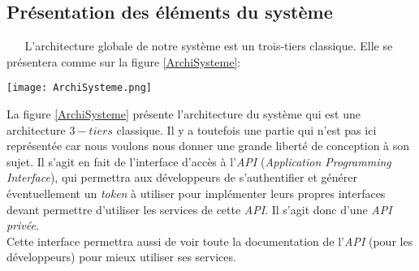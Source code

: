 \subsection{Présentation des éléments du système}
$ _{} $ $ _{} $ $ _{} $ $ _{} $ $ _{} $L'architecture globale de notre système est un trois-tiers classique. Elle se présentera comme sur la figure \ref{ArchiSysteme}:
\begin{center}
\texttt{[image: ArchiSysteme.png]}
\label{ArchiSysteme}
\end{center}
La figure \ref{ArchiSysteme} présente l'architecture du système qui est une architecture $ 3-tiers $ classique. Il y a toutefois une partie qui n'est pas ici représentée car nous voulons nous donner une grande liberté de conception à son sujet. Il s'agit en fait de l'interface d'accès à l'\textit{API} (\textit{Application Programming Interface}), qui permettra aux développeurs de s'authentifier et générer éventuellement un \textit{token} à utiliser pour implémenter leurs propres interfaces devant permettre d'utiliser les services de cette \textit{API}. Il s'agit donc d'une \textit{API privée}.\\
Cette interface permettra aussi de voir toute la documentation de l'\textit{API} (pour les dé\-ve\-lop\-peurs) pour mieux utiliser ses services.

